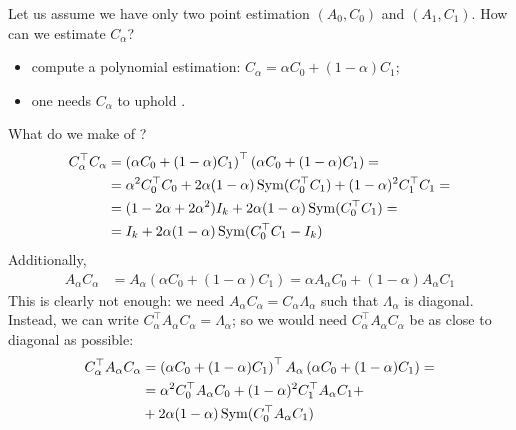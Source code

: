 \documentclass{mynotes}
\begin{document}
Let us assume we have only two point estimation \( ( A_0, C_0) \) and \( (A_1, C_1 ) \). How can we estimate \( C_{\alpha}\)?
\begin{itemize}[itemsep = -5pt]
      \item compute a polynomial estimation: \( C_\alpha = \alpha C_0 + (1 - \alpha ) C_1 \);
      \item one needs \( C_\alpha \) to uphold .
\end{itemize}
What do we make of ?
\begin{equation}
      \begin{aligned}
            C_\alpha^\top C_\alpha & = \left( \alpha C_0 + (1 - \alpha ) C_1 \right)^\top \left( \alpha C_0 + (1 - \alpha ) C_1 \right) = \\
            & = \alpha^2 C_0^\top C_0 + 2 \alpha (1-\alpha) \operatorname{Sym}( C_0^\top C_1 ) + (1-\alpha)^2 C_1^\top C_1 = \\
            & = ( 1 - 2\alpha + 2 \alpha^2) I_k + 2 \alpha (1-\alpha) \operatorname{Sym}( C_0^\top C_1 )  = \\
            & = I_k + 2 \alpha (1-\alpha) \operatorname{Sym}( C_0^\top C_1 - I_k )
      \end{aligned}
\end{equation}
Additionally,
\begin{equation}
      \begin{aligned}
            A_\alpha C_\alpha & = A_\alpha  \left( \alpha C_0 + (1 - \alpha ) C_1 \right) =  \alpha A_\alpha C_0 + (1 - \alpha ) A_\alpha C_1
      \end{aligned}
\end{equation}
This is clearly not enough: we need \( A_\alpha C_\alpha = C_\alpha \Lambda_\alpha \) such that \( \Lambda_\alpha \) is diagonal. Instead, we can write \( C_\alpha^\top A_\alpha C_\alpha = \Lambda_\alpha \); so we would need \( C_\alpha^\top A_\alpha C_\alpha \) be as close to diagonal as possible:
\begin{equation}
      \begin{aligned}
            C_\alpha^\top A_\alpha C_\alpha & = \left( \alpha C_0 + (1 - \alpha ) C_1 \right)^\top A_\alpha \left( \alpha C_0 + (1 - \alpha ) C_1 \right) = \\
            & = \alpha^2 C_0^\top A_\alpha C_0 + (1-\alpha)^2 C_1^\top A_\alpha C_1 + \\
            & + 2 \alpha (1-\alpha) \operatorname{Sym}( C_0^\top A_\alpha C_1 )
      \end{aligned}
\end{equation}
\end{document}
